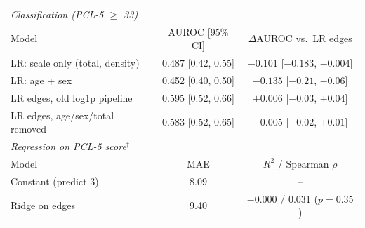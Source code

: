 \begin{tabular}{lcc}
\toprule
\multicolumn{3}{l}{\emph{Classification (PCL-5 $\geq$ 33)}} \\
Model & AUROC [95\% CI] & $\Delta$AUROC vs.\ LR edges \\
\midrule
LR: scale only (total, density) & 0.487 [0.42, 0.55] & $-0.101$ [$-0.183$, $-0.004$] \\
LR: age + sex & 0.452 [0.40, 0.50] & $-0.135$ [$-0.21$, $-0.06$] \\
LR edges, old log1p pipeline & 0.595 [0.52, 0.66] & $+0.006$ [$-0.03$, $+0.04$] \\
LR edges, age/sex/total removed & 0.583 [0.52, 0.65] & $-0.005$ [$-0.02$, $+0.01$] \\
\midrule
\multicolumn{3}{l}{\emph{Regression on PCL-5 score}$^\dagger$} \\
Model & MAE & $R^2$ / Spearman $\rho$ \\
\midrule
Constant (predict 3) & 8.09 & -- \\
Ridge on edges & 9.40 & $-0.000$ / 0.031 ($p=0.35$) \\
\bottomrule
\end{tabular}
